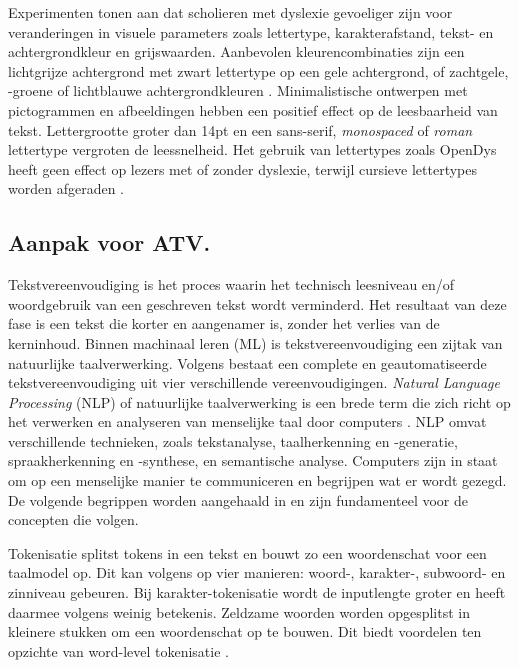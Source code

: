 \medspace

Experimenten tonen aan dat scholieren met dyslexie gevoeliger zijn voor veranderingen in visuele parameters zoals lettertype, karakterafstand, tekst- en achtergrondkleur en grijswaarden. Aanbevolen kleurencombinaties zijn een lichtgrijze achtergrond met zwart lettertype op een gele achtergrond, of zachtgele, -groene of lichtblauwe achtergrondkleuren \autocite{Rello2015, Bezem2016, Rello2017}. Minimalistische ontwerpen met pictogrammen en afbeeldingen hebben een positief effect op de leesbaarheid van tekst. Lettergrootte groter dan 14pt en een sans-serif, \textit{monospaced} of \textit{roman} lettertype vergroten de leessnelheid. Het gebruik van lettertypes zoals OpenDys heeft geen effect op lezers met of zonder dyslexie, terwijl cursieve lettertypes worden afgeraden \autocite{Rello2013b, Rello2015}.

\subsection{Aanpak voor ATV.}

Tekstvereenvoudiging is het proces waarin het technisch leesniveau en/of woordgebruik van een geschreven tekst wordt verminderd. Het resultaat van deze fase is een tekst die korter en aangenamer is, zonder het verlies van de kerninhoud. Binnen machinaal leren (ML) is tekstvereenvoudiging een zijtak van natuurlijke taalverwerking. \autocite{Siddharthan2006} Volgens \autocite{Siddharthan2014} bestaat een complete en geautomatiseerde tekstvereenvoudiging uit vier verschillende vereenvoudigingen. \textit{Natural Language Processing} (NLP) of natuurlijke taalverwerking is een brede term die zich richt op het verwerken en analyseren van menselijke taal door computers \autocite{Eisenstein2019}. NLP omvat verschillende technieken, zoals tekstanalyse, taalherkenning en -generatie, spraakherkenning en -synthese, en semantische analyse. Computers zijn in staat om op een menselijke manier te communiceren en begrijpen wat er wordt gezegd. De volgende begrippen worden aangehaald in \textcite{Sohom2019, Eisenstein2019} en zijn fundamenteel voor de concepten die volgen.

\medspace

Tokenisatie splitst tokens in een tekst en bouwt zo een woordenschat voor een taalmodel op. Dit kan volgens \textcite{Menzli2023} op vier manieren: woord-, karakter-, subwoord- en zinniveau gebeuren. Bij karakter-tokenisatie wordt de inputlengte groter en heeft daarmee volgens \textcite{Ribeiro2018} weinig betekenis. Zeldzame woorden worden opgesplitst in kleinere stukken om een woordenschat op te bouwen. Dit biedt voordelen ten opzichte van word-level tokenisatie \autocite{Iredale2022}.

